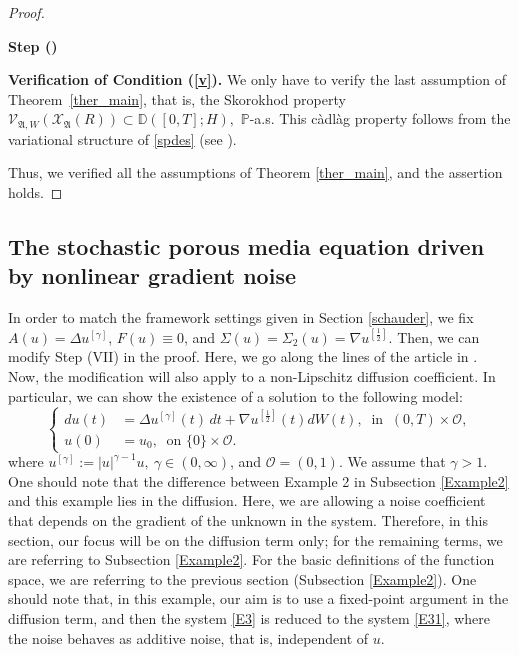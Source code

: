 \documentclass[english,a4paper,11pt]{amsart}
\theoremstyle{plain}
\theoremstyle{definition}
\theoremstyle{remark}
\numberwithin{equation}{section}
\newcounter{lil1}
\newenvironment{step}
{\begin{list} { \bf Step (\Roman{lil1})}
		{ \usecounter{lil1}
			\setlength{\leftmargin}{0.0cm}
			\setlength{\topsep}{0.2cm}
			\setlength{\itemsep}{0.0cm}
			\setlength{\parsep}{0.1cm}
			\setlength{\itemindent}{0.8cm}
			\setlength{\parskip}{0.0cm}}}
	{\end{list}}
\newcounter{lil33}
\newcounter{lil1q}
\newcommand{\Ocal} {{\mathcal O}}
\newcommand{\Vcal} {{\mathcal V}}
\newcommand{\Xcal} {{\mathcal X}}
\newcommand{\Afrak} {{\mathfrak A}}
\renewcommand{\P}{\mathbb{P}}
\newcommand{\D}{\mathbb{D}}
\begin{document}
\begin{proof}
\begin{step}
\item \textbf{Verification of Condition (\ref{v}).} 
{We only have to verify the last assumption of Theorem~\ref{ther_main}, that is, the Skorokhod property  $\Vcal_{\Afrak,W}(\Xcal_{\Afrak}(R))\subset \D([0,T];H),$ $\P$-a.s. This c\`adl\`ag property follows from the variational structure of \eqref{spdes} (see \cite{KrylovRozovskii,weiroeckner}).}
\end{step}Thus, we verified all the assumptions of Theorem \ref{ther_main}, and the assertion holds.
\end{proof}





\subsection{The stochastic porous media equation driven by nonlinear gradient noise}\label{Example3}

In order to match the framework settings given in Section \ref{schauder}, we fix $A(u)=\Delta u^{[\gamma]}$, $F(u)\equiv 0$, and {$\Sigma(u)=\Sigma_2(u)=\nabla u^{[\frac{1}{2}]} $}.
{Then, we can modify Step (VII) in the proof. Here, we go along the lines of the article in \cite{FKEHMH}}.
Now, the modification will also apply to a non-Lipschitz diffusion coefficient. 
In particular, we can show the existence of a solution to the following model:
\begin{equation}\label{E3}
	\left\{
	\begin{aligned}
		du(t)&=\Delta u^{[\gamma]}(t)\, dt + {\nabla u^{[\frac{1}{2}]}(t)}dW(t),\ \text{ in } \ (0,T)\times \Ocal,\\
		u(0)&=u_0, \ \text{ on } \{0\}\times \Ocal. 
	\end{aligned}
	\right.
\end{equation}where $u^{[\gamma]}:=|u|^{\gamma-1}u, \ \gamma\in (0,\infty)$, and $\Ocal=(0,1)$. We assume that $\gamma>1$. One should note that the difference between Example 2 in Subsection \ref{Example2} and this example lies in the diffusion. Here, we are allowing a noise coefficient that depends on the gradient of the unknown in the system. Therefore, in this section, our focus will be on the diffusion term only; for the remaining terms, we are referring to Subsection \ref{Example2}. For the basic definitions of the function space, we are referring to the previous section (Subsection \ref{Example2}). One should note that, in this example, our aim is to use a fixed-point argument in the diffusion term, and then the system \eqref{E3} is reduced to the system \eqref{E31}, where the noise behaves as additive noise, that is, independent of $u$.
\end{document}
